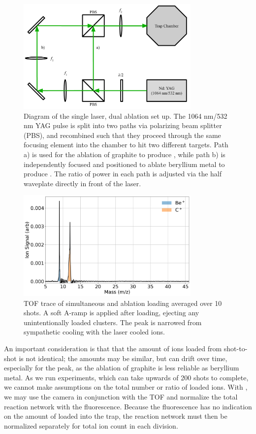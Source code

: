 \begin{figure}[H]
	\centering
	\includegraphics[width=0.8\textwidth]{images/ablation_optics_diagram.pdf}
	\caption{Diagram of the single laser, dual ablation set up. The 1064 nm/532 nm YAG pulse is split into two paths via polarizing beam splitter (PBS), and recombined such that they proceed through the same focusing element into the chamber to hit two different targets. Path a) is used for the ablation of graphite to produce , while path b) is independently focused and positioned to ablate beryllium metal to produce . The ratio of power in each path is adjusted via the half waveplate directly in front of the laser.}
	\label{fig: dual ablation}
\end{figure}

\begin{figure}[H]
	\centering
	\includegraphics[width=0.8\textwidth]{images/Be_C_TOF.png}
	\caption{TOF trace of simultaneous  and  ablation loading averaged over 10 shots. A soft A-ramp is applied after loading, ejecting any unintentionally loaded  clusters. The  peak is narrowed from sympathetic cooling with the laser cooled  ions.}
	\label{fig: Be C TOF}
\end{figure}

An important consideration is that that the amount of ions loaded from shot-to-shot is not identical; the amounts may be similar, but can drift over time, especially for the  peak, as the ablation of graphite is less reliable as beryllium metal. As we run experiments, which can take upwards of 200 shots to complete, we cannot make assumptions on the total number or ratio of loaded ions. With , we may use the camera in conjunction with the TOF and normalize the total  reaction network with the fluorescence. Because the  fluorescence has no indication on the amount of  loaded into the trap, the  reaction network must then be normalized separately for total ion count in each division.